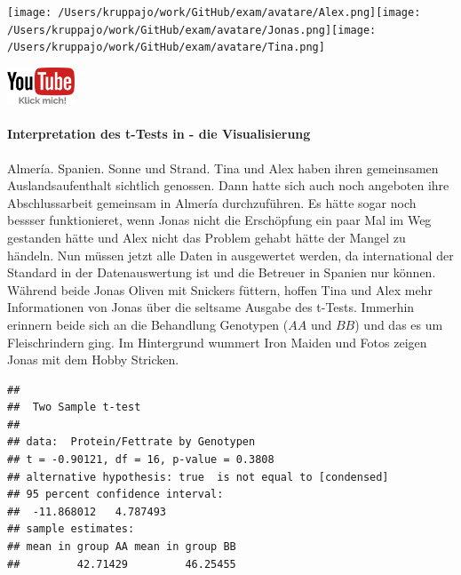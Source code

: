 \documentclass[a4paper, 9pt]{scrartcl}\usepackage[]{graphicx}\usepackage[]{xcolor}
\makeatletter
\newenvironment{kframe}{%
 \def\at@end@of@kframe{}%
 \ifinner\ifhmode%
  \def\at@end@of@kframe{\end{minipage}}%
  \begin{minipage}{\columnwidth}%
 \fi\fi%
 \def\FrameCommand##1{\hskip\@totalleftmargin \hskip-\fboxsep
 \colorbox{shadecolor}{##1}\hskip-\fboxsep
     \hskip-\linewidth \hskip-\@totalleftmargin \hskip\columnwidth}%
 \MakeFramed {\advance\hsize-\width
   \@totalleftmargin\z@ \linewidth\hsize
   \@setminipage}}%
 {\par\unskip\endMakeFramed%
 \at@end@of@kframe}
\newenvironment{knitrout}{}{} %
\makeatother
\begin{document}
 
\begin{minipage}[t]{0.5\textwidth}
\texttt{[image: /Users/kruppajo/work/GitHub/exam/avatare/Alex.png]}\hspace{-4mm}\texttt{[image: /Users/kruppajo/work/GitHub/exam/avatare/Jonas.png]}\hspace{-4mm}\texttt{[image: /Users/kruppajo/work/GitHub/exam/avatare/Tina.png]}
\end{minipage}
\begin{minipage}[t]{0.5\textwidth}
\hfill
\href{https://youtu.be/w62HJlbN28U}{\includegraphics[width = 2cm]{img/youtube}}
\end{minipage}



\paragraph{Interpretation des t-Tests in \Rlogo - die Visualisierung}

Almería. Spanien. Sonne und Strand. Tina und Alex haben ihren gemeinsamen Auslandsaufenthalt sichtlich genossen. Dann hatte sich auch noch angeboten ihre Abschlussarbeit gemeinsam in Almería durchzuführen. Es hätte sogar noch bessser funktionieret, wenn Jonas nicht die Erschöpfung ein paar Mal im Weg gestanden hätte und Alex nicht das Problem gehabt hätte der Mangel zu händeln. Nun müssen jetzt alle Daten in \Rlogo ausgewertet werden, da \Rlogo international der Standard in der Datenauswertung ist und die Betreuer in Spanien nur \Rlogo können. Während beide Jonas Oliven mit Snickers füttern, hoffen Tina und Alex mehr Informationen von Jonas über die seltsame \Rlogo Ausgabe des t-Tests. Immerhin erinnern beide sich an die Behandlung Genotypen ($AA$ und $BB$) und das es um Fleischrindern ging. Im Hintergrund wummert Iron Maiden und Fotos zeigen Jonas mit dem Hobby Stricken.

\begin{knitrout}
\color{fgcolor}\begin{kframe}
\begin{verbatim}
## 
## 	Two Sample t-test
## 
## data:  Protein/Fettrate by Genotypen
## t = -0.90121, df = 16, p-value = 0.3808
## alternative hypothesis: true  is not equal to [condensed]
## 95 percent confidence interval:
##  -11.868012   4.787493
## sample estimates:
## mean in group AA mean in group BB 
##         42.71429         46.25455
\end{verbatim}
\end{kframe}
\end{knitrout}
\end{document}
